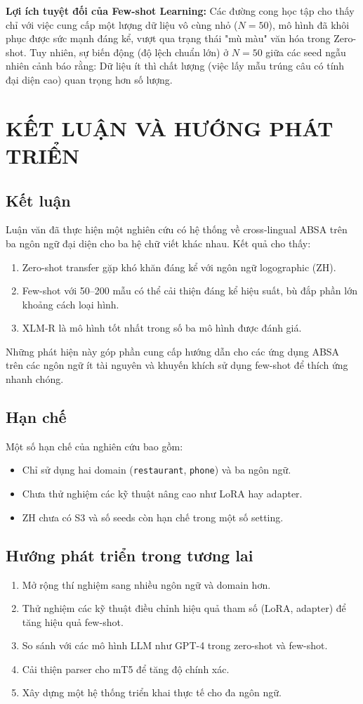 \documentclass[12pt,a4paper,oneside]{report}
\begin{document}
\textbf{Lợi ích tuyệt đối của Few-shot Learning:} Các đường cong học tập cho thấy chỉ với việc cung cấp một lượng dữ liệu vô cùng nhỏ ($N=50$), mô hình đã khôi phục được sức mạnh đáng kể, vượt qua trạng thái "mù màu" văn hóa trong Zero-shot. Tuy nhiên, sự biến động (độ lệch chuẩn lớn) ở $N=50$ giữa các seed ngẫu nhiên cảnh báo rằng: Dữ liệu ít thì chất lượng (việc lấy mẫu trúng câu có tính đại diện cao) quan trọng hơn số lượng.

\chapter{KẾT LUẬN VÀ HƯỚNG PHÁT TRIỂN}
\section{Kết luận}
Luận văn đã thực hiện một nghiên cứu có hệ thống về cross-lingual ABSA trên ba ngôn ngữ đại diện cho ba hệ chữ viết khác nhau. Kết quả cho thấy:
\begin{enumerate}
    \item Zero-shot transfer gặp khó khăn đáng kể với ngôn ngữ logographic (ZH).
    \item Few-shot với 50–200 mẫu có thể cải thiện đáng kể hiệu suất, bù đắp phần lớn khoảng cách loại hình.
    \item XLM-R là mô hình tốt nhất trong số ba mô hình được đánh giá.
\end{enumerate}
Những phát hiện này góp phần cung cấp hướng dẫn cho các ứng dụng ABSA trên các ngôn ngữ ít tài nguyên và khuyến khích sử dụng few-shot để thích ứng nhanh chóng.

\section{Hạn chế}
Một số hạn chế của nghiên cứu bao gồm:
\begin{itemize}
    \item Chỉ sử dụng hai domain (\texttt{restaurant}, \texttt{phone}) và ba ngôn ngữ.
    \item Chưa thử nghiệm các kỹ thuật nâng cao như LoRA hay adapter.
    \item ZH chưa có S3 và số seeds còn hạn chế trong một số setting.
\end{itemize}

\section{Hướng phát triển trong tương lai}
\begin{enumerate}
    \item Mở rộng thí nghiệm sang nhiều ngôn ngữ và domain hơn.
    \item Thử nghiệm các kỹ thuật điều chỉnh hiệu quả tham số (LoRA, adapter) để tăng hiệu quả few-shot.
    \item So sánh với các mô hình LLM như GPT-4 trong zero-shot và few-shot.
    \item Cải thiện parser cho mT5 để tăng độ chính xác.
    \item Xây dựng một hệ thống triển khai thực tế cho đa ngôn ngữ.
\end{enumerate}
\end{document}
